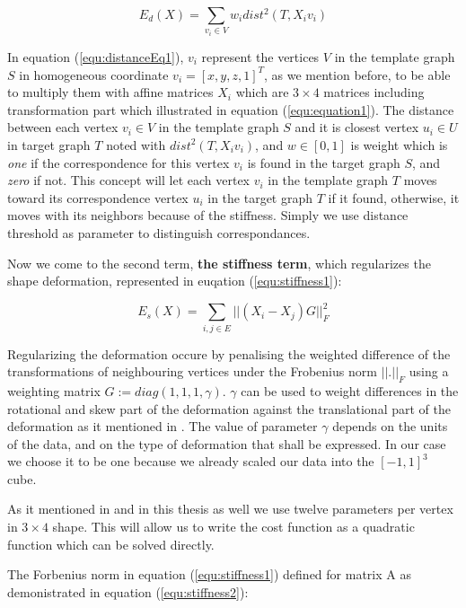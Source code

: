 \documentclass[../structure.tex]{subfiles}
\begin{document}
\begin{equation}
E_{d}(X) = \sum_{v_{i} \in V} w_{i}dist^2(T,X_{i}v_{i})
\label{equ:distance1}
\end{equation}

In equation (\ref{equ:distanceEq1}), $v_{i}$ represent the vertices $V$ in the template graph $S$ in homogeneous coordinate $v_{i} = [x,y,z,1]^T$, as we mention before, to be able to multiply them with affine matrices $X_{i}$ which are $3 \times 4$ matrices including transformation part which illustrated in equation (\ref{equ:equation1}). The distance between each vertex $v_{i} \in V$ in the template graph $S$ and it is closest vertex $u_{i} \in U$ in target graph $T$ noted with $dist^2(T,X_{i}v_{i})$, and $w \in [0,1]$ is weight which is \textit{one} if the correspondence for this vertex $v_{i}$ is found in the target graph $S$, and \textit{zero} if not. This concept will let each vertex $v_{i}$ in the template graph $T$ moves toward its correspondence vertex $u_{i}$ in the target graph $T$ if it found, otherwise, it moves with its neighbors because of the stiffness. Simply we use distance threshold as parameter to distinguish correspondances.

Now we come to the second term, \textbf{the stiffness term}, which regularizes the shape deformation, represented in euqation (\ref{equ:stiffness1}):

\begin{equation}
E_{s}(X) = \sum_{i,j \in E} ||(X_{i} - X_{j})G||_{F}^2
\label{equ:stiffness1}
\end{equation}

Regularizing the deformation occure by penalising the weighted difference of the transformations of neighbouring vertices under the Frobenius norm $||.||_{F}$ using a weighting matrix $G := diag(1, 1, 1, \gamma)$.
$\gamma$ can be used to weight differences in the rotational and skew part of the deformation against the translational part of the deformation as it mentioned in \cite{Amberg2007}. The value of parameter $\gamma$ depends on the units of the data, and on the type of deformation that shall be expressed. In our case we choose it to be one because we already scaled our data into the $[-1, 1]^3$ cube.

As it mentioned in \cite{Amberg2007} and in this thesis as well we use twelve parameters per vertex in $3 \times 4$ shape. This will allow us to write the cost function as a quadratic function which can be solved directly.

The Forbenius norm in equation (\ref{equ:stiffness1}) defined for matrix A as demonistrated in equation (\ref{equ:stiffness2}):
\end{document}
